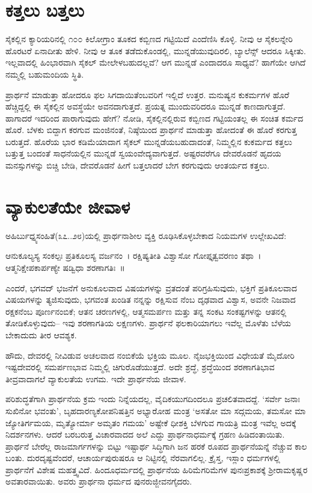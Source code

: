 \section{ಕತ್ತಲು ಬತ್ತಲು}

ಸೈಕಲ್ಲಿನ ಕ್ಯಾರಿಯರಿನಲ್ಲಿ ೧೦೦ ಕಿಲೋಗ್ರಾಂ ತೂಕದ ಕಬ್ಬಿಣದ ಗಟ್ಟಿಯಿದೆ ಎಂದೆಣಿಸಿ ಕೊಳ್ಳಿ. ನೀವು ಆ ಸೈಕಲನ್ನೇರಿ ಹೊರಟರೆ ಏನಾದೀತು ಹೇಳಿ. ನೀವು ಆ ತೂಕ ತಡೆದುಕೊಂಡಲ್ಲಿ, ಮುನ್ನಡೆಯುವುದಿರಲಿ, ಬ್ಯಾಲೆನ್ಸ್ ಆದರೂ ಸಿಕ್ಕೀತು. ಇಲ್ಲವಾದಲ್ಲಿ ಹಿಂಭಾರವಾಗಿ ಸೈಕಲ್ ಮೇಲೇಳಬಹುದಲ್ಲವೆ? ಆಗ ಮುನ್ನಡೆ ಎಂದಾದರೂ ಸಾಧ್ಯವೆ? ಹಾಗೆಯೇ ಆಗಿದೆ ನಮ್ಮಲ್ಲಿ ಬಹುಮಂದಿಯ ಸ್ಥಿತಿ.

ಪ್ರಾರ್ಥನೆ ಮಾಡುತ್ತಾ ಹೋದರೂ ಫಲ ಸಿಗದಾಯಿತೆಂಬವರಿಗೆ ಇಲ್ಲಿದೆ ಉತ್ತರ. ಮನುಷ್ಯನ ಕುಕರ್ಮಗಳ ಹೊರೆ ಹೆಚ್ಚಿದ್ದಲ್ಲಿ ಈ ಸೈಕಲ್ಲಿನ ಅವಸ್ಥೆಯೇ ಅವನದಾಗುತ್ತದೆ. ಪ್ರಯತ್ನ ಮುಂದುವರಿದರೂ ಮುನ್ನಡೆ ಕಾಣದಾಗುತ್ತದೆ. ಹಾಗಾದರೆ ಇದರಿಂದ ಪಾರಾಗುವುದು ಹೇಗೆ? ನೋಡಿ, ಸೈಕಲ್ಲಿನಲ್ಲಿರುವ ಕಬ್ಬಿಣದ ಗಟ್ಟಿಯಂತಲ್ಲ ಈ ಸಂಚಿತ ಕರ್ಮದ ಹೊರೆ. ಬೆಳಕು ಬಿದ್ದಾಗ ಕರಗುವ ಮಂಜಿನಂತೆ, ನಿಷ್ಠೆಯಿಂದ ಪ್ರಾರ್ಥನೆ ಮಾಡುತ್ತಾ ಹೋದಂತೆ ಈ ಹೊರೆ ಕರಗುತ್ತ ಬರುತ್ತದೆ. ಹೊರೆಯ ಭಾರ ಕಡಿಮೆಯಾದಾಗ ಸೈಕಲ್ ಮುನ್ನಡೆಯಬಹುದಾದಂತೆ, ನಿಮ್ಮಲ್ಲಿನ ಕುಕರ್ಮದ ಕತ್ತಲು ಬತ್ತುತ್ತ ಬಂದಂತೆ ಸಾಧನೆಯಲ್ಲಿನ ಮುನ್ನಡೆ ಸ್ವಯಂವೇದ್ಯವಾಗುತ್ತದೆ. ಅಷ್ಟರವರೆಗೂ ದೇವರೊಡನೆ ಹೃದಯ ಮನಸ್ಸುಗಳನ್ನು ಬಿಚ್ಚಿ ಬೇಡಿ, ದೇವರೊಡನೆ ಹೀಗೆ ಬತ್ತಲಾದರೆ ಬೇಗ ಕರಗುವುದು ಆಂತರ್ಯದ ಕತ್ತಲು.


\section{ವ್ಯಾಕುಲತೆಯೇ ಜೀವಾಳ}

ಅಹಿರ್ಬುಧ್ನ್ಯಸಂಹಿತೆ(೩೭..೨೮)ಯಲ್ಲಿ ಪ್ರಾರ್ಥನಾಶೀಲ ವ್ಯಕ್ತಿ ರೂಢಿಸಿಕೊಳ್ಳಬೇಕಾದ ನಿಯಮಗಳ ಉಲ್ಲೇಖವಿದೆ:

ಆನುಕೂಲ್ಯಸ್ಯ ಸಂಕಲ್ಪಃ ಪ್ರತಿಕೂಲಸ್ಯ ವರ್ಜನಂ~। ರಕ್ಷಿಷ್ಯತೀತಿ ವಿಶ್ವಾಸೋ ಗೋಪ್ತೃತ್ವವರಣಂ ತಥಾ~। ಆತ್ಮನಿಕ್ಷೇಪಕಾರ್ಪಣ್ಯೇ ಷಡ್ವಿಧಾ ಶರಣಾಗತಿಃ~॥

ಎಂದರೆ, ಭಗವದ್ ಭಜನೆಗೆ ಅನುಕೂಲವಾದ ವಿಷಯಗಳನ್ನು ವ್ರತದಂತೆ ಪರಿಗ್ರಹಿಸುವುದು, ಭಕ್ತಿಗೆ ಪ್ರತಿಕೂಲವಾದ ವಿಷಯಗಳನ್ನು ತ್ಯಜಿಸುವುದು, ಭಗವಂತ ಖಂಡಿತ ನನ್ನನ್ನು ರಕ್ಷಿಸುವ ನೆಂಬ ದೃಢವಾದ ವಿಶ್ವಾಸ, ಅವನೇ ನಿಜವಾದ ರಕ್ಷಕನೆಂಬ ಪೂರ್ಣನಂಬಿಕೆ; ಆತನ ಚರಣಗಳಲ್ಲಿ, ಆತ್ಮಸಮರ್ಪಣ ಮತ್ತು ತನ್ನ ಸಂಕಟ ಸಂಕಷ್ಟಗಳನ್ನು ಆತನಲ್ಲಿ ತೋಡಿಕೊಳ್ಳುವುದು– ಇವು ಶರಣಾಗತಿಯ ಲಕ್ಷಣಗಳು. ಪ್ರಾರ್ಥನೆ ಫಲಕಾರಿಯಾಗಲು ಇವೆಲ್ಲ ಮೊಳೆತು ಬೆಳೆಯ ಬೇಕಾದುದು ತೀರ ಆವಶ್ಯಕ.

ಹೌದು, ದೇವರಲ್ಲಿ ನೀವಿಡುವ ಅಚಲವಾದ ನಂಬಿಕೆಯೆ ಭಕ್ತಿಯ ಮೂಲ. ನೈಜಭಕ್ತಿಯಿಂದ ವಿಧೇಯತೆ ಮೈದೋರಿ ಇಷ್ಟದೇವರಲ್ಲಿ ಸಮರ್ಪಣಭಾವ ನಿಮ್ಮಲ್ಲಿ ಚಿಗುರೊಡೆಯುತ್ತದೆ. ಅದೇ ಶ್ರದ್ಧೆ, ಶ್ರದ್ಧೆಯಿಂದ ಶರಣಾಗತಿಭಾವ ತೀವ್ರವಾದಾಗಲೆ ವ್ಯಾಕುಲತೆಯ ಉಗಮ. ಇದೇ ಪ್ರಾರ್ಥನೆಯ ಜೀವಾಳ.

ಪರಿಶುದ್ಧತೆಗಾಗಿ ಪ್ರಾರ್ಥನೆಯ ಕ್ರಮ ಇಂದು ನಿನ್ನೆಯದಲ್ಲ, ವೈದಿಕಯುಗದಿಂದಲೂ ಪ್ರಚಲಿತವಾದದ್ದೆ. ‘ಸರ್ವೇ ಜನಾಃ ಸುಖಿನೋ ಭವಂತು’, ಬೃಹದಾರಣ್ಯಕೋಪನಿಷತ್ತಿನ ಅಭ್ಯಾರೋಹ ಮಂತ್ರ ‘ಅಸತೋ ಮಾ ಸದ್ಗಮಯ, ತಮಸೋ ಮಾ ಜ್ಯೋತಿರ್ಗಮಯ, ಮೃತ್ಯೋರ್ಮಾ ಅಮೃತಂ ಗಮಯ’ ಅಷ್ಟೇಕೆ ಧೀಶಕ್ತಿ ಬೆಳಗುವ ಗಾಯತ್ರಿ ಮಂತ್ರ ಇವೆಲ್ಲ ಅದಕ್ಕೆ ನಿದರ್ಶನಗಳು. ಆದರೆ ಬರಬರುತ್ತ ವಿಚಾರವಾದದ ಅಲೆ ಎದ್ದು ಪ್ರಾರ್ಥನಾಧರ್ಮಕ್ಕೆ ಗ್ರಹಣ ಹಿಡಿದಂತಾಯಿತು. ಪ್ರಾರ್ಥನೆ ಬೇರೆಲ್ಲ ರಾಜಮಾರ್ಗಗಳನ್ನು ಬಿಟ್ಟು ಇಷ್ಟಾರ್ಥ ಸಿದ್ಧಿಗಾಗಿ ಜನ ಹರಕೆ ರೂಪದ ಪ್ರಾರ್ಥನೆಯನ್ನೆ ನೆಚ್ಚುವ ಕಾಲ ಬಂತು. ದುರದೃಷ್ಟವೆಂದರೆ, ಆಚಾರ್ಯಪುರುಷರೂ ಆ ನಿಟ್ಟಿನಲ್ಲಿ ನೆರವಾಗಲಿಲ್ಲ. ಕ್ರೈಸ್ತ, ಇಸ್ಲಾಂ ಧರ್ಮಗಳಲ್ಲಿ ಪ್ರಾರ್ಥನೆಗೆ ವಿಶೇಷ ಮಹತ್ತ್ವವಿದೆ. ಹಿಂದೂಧರ್ಮದಲ್ಲಿ ಪ್ರಾರ್ಥನೆಯ ಹಿರಿಮೆಗರಿಮೆಗಳ ಪುನಃಪ್ರಕಾಶಕ್ಕೆ ಶ‍್ರೀರಾಮಕೃಷ್ಣರ ಅವತಾರವಾಯಿತು. ಅವರು ಪ್ರಾರ್ಥನಾ ಧರ್ಮದ ಪುನರುಜ್ಜೀವನಗೈದರು.

